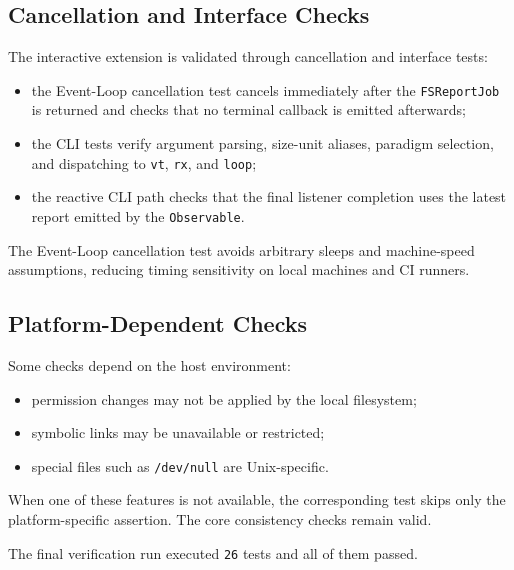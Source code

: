 \subsection{Cancellation and Interface Checks}

The interactive extension is validated through cancellation and interface
tests:

\begin{itemize}
  \item the Event-Loop cancellation test cancels immediately after the
  \texttt{FSReportJob} is returned and checks that no terminal callback is
  emitted afterwards;
  \item the CLI tests verify argument parsing, size-unit aliases, paradigm
  selection, and dispatching to \texttt{vt}, \texttt{rx}, and \texttt{loop};
  \item the reactive CLI path checks that the final listener completion uses
  the latest report emitted by the \texttt{Observable}.
\end{itemize}

The Event-Loop cancellation test avoids arbitrary sleeps and machine-speed
assumptions, reducing timing sensitivity on local machines and CI runners.

\subsection{Platform-Dependent Checks}

Some checks depend on the host environment:

\begin{itemize}
  \item permission changes may not be applied by the local filesystem;
  \item symbolic links may be unavailable or restricted;
  \item special files such as \texttt{/dev/null} are Unix-specific.
\end{itemize}

When one of these features is not available, the corresponding test skips only
the platform-specific assertion. The core consistency checks remain valid.

The final verification run executed \texttt{26} tests and all of them passed.
